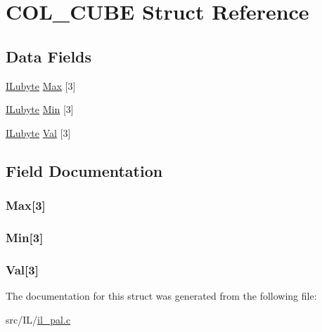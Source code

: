 \hypertarget{struct_c_o_l___c_u_b_e}{\section{C\-O\-L\-\_\-\-C\-U\-B\-E Struct Reference}
\label{struct_c_o_l___c_u_b_e}
}
\subsection*{Data Fields}
\begin{DoxyCompactItemize}
\item 
\hyperlink{il_8h_a8d2f04500100a86d1b00e98ab1b15a33}{I\-Lubyte} \hyperlink{struct_c_o_l___c_u_b_e_a6e34aa6f65b67d9b6f7f9d94614f71e7}{Max} \mbox{[}3\mbox{]}
\item 
\hyperlink{il_8h_a8d2f04500100a86d1b00e98ab1b15a33}{I\-Lubyte} \hyperlink{struct_c_o_l___c_u_b_e_a08f7243c4175d8dd4e6610ccfe54223b}{Min} \mbox{[}3\mbox{]}
\item 
\hyperlink{il_8h_a8d2f04500100a86d1b00e98ab1b15a33}{I\-Lubyte} \hyperlink{struct_c_o_l___c_u_b_e_a698a912db04dbc3c37738cc148dcd545}{Val} \mbox{[}3\mbox{]}
\end{DoxyCompactItemize}


\subsection{Field Documentation}
\hypertarget{struct_c_o_l___c_u_b_e_a6e34aa6f65b67d9b6f7f9d94614f71e7}{
\subsubsection[{Max}]{ Max\mbox{[}3\mbox{]}}}\label{struct_c_o_l___c_u_b_e_a6e34aa6f65b67d9b6f7f9d94614f71e7}
\hypertarget{struct_c_o_l___c_u_b_e_a08f7243c4175d8dd4e6610ccfe54223b}{
\subsubsection[{Min}]{ Min\mbox{[}3\mbox{]}}}\label{struct_c_o_l___c_u_b_e_a08f7243c4175d8dd4e6610ccfe54223b}
\hypertarget{struct_c_o_l___c_u_b_e_a698a912db04dbc3c37738cc148dcd545}{
\subsubsection[{Val}]{ Val\mbox{[}3\mbox{]}}}\label{struct_c_o_l___c_u_b_e_a698a912db04dbc3c37738cc148dcd545}


The documentation for this struct was generated from the following file\-:\begin{DoxyCompactItemize}
\item 
src/\-I\-L/\hyperlink{il__pal_8c}{il\-\_\-pal.\-c}\end{DoxyCompactItemize}
